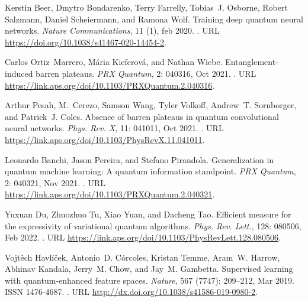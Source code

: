 \documentclass[letterpaper,preprintnumbers,preprint,aps,accepted=2022-05-26]{quantumarticle}
\begin{document}
\begin{thebibliography}{39}
Kerstin Beer, Dmytro Bondarenko, Terry Farrelly, Tobias~J. Osborne, Robert
  Salzmann, Daniel Scheiermann, and Ramona Wolf.
\newblock Training deep quantum neural networks.
\newblock \emph{Nature Communications}, 11 (1), feb 2020.
\newblock {}.
\newblock URL \url{https://doi.org/10.1038/s41467-020-14454-2}.

Carlos Ortiz~Marrero, M\'aria Kieferov\'a, and Nathan Wiebe.
\newblock Entanglement-induced barren plateaus.
\newblock \emph{PRX Quantum}, 2: 040316, Oct 2021.
\newblock {}.
\newblock URL \url{https://link.aps.org/doi/10.1103/PRXQuantum.2.040316}.

Arthur Pesah, M.~Cerezo, Samson Wang, Tyler Volkoff, Andrew~T. Sornborger, and
  Patrick~J. Coles.
\newblock Absence of barren plateaus in quantum convolutional neural networks.
\newblock \emph{Phys. Rev. X}, 11: 041011, Oct 2021.
\newblock {}.
\newblock URL \url{https://link.aps.org/doi/10.1103/PhysRevX.11.041011}.

Leonardo Banchi, Jason Pereira, and Stefano Pirandola.
\newblock Generalization in quantum machine learning: A quantum information
  standpoint.
\newblock \emph{PRX Quantum}, 2: 040321, Nov 2021.
\newblock {}.
\newblock URL \url{https://link.aps.org/doi/10.1103/PRXQuantum.2.040321}.

Yuxuan Du, Zhuozhuo Tu, Xiao Yuan, and Dacheng Tao.
\newblock Efficient measure for the expressivity of variational quantum
  algorithms.
\newblock \emph{Phys. Rev. Lett.}, 128: 080506, Feb 2022.
\newblock {}.
\newblock URL \url{https://link.aps.org/doi/10.1103/PhysRevLett.128.080506}.

Vojtěch Havlíček, Antonio~D. Córcoles, Kristan Temme, Aram~W. Harrow,
  Abhinav Kandala, Jerry~M. Chow, and Jay~M. Gambetta.
\newblock Supervised learning with quantum-enhanced feature spaces.
\newblock \emph{Nature}, 567 (7747): 209–212, Mar 2019.
\newblock ISSN 1476-4687.
\newblock {}.
\newblock URL \url{http://dx.doi.org/10.1038/s41586-019-0980-2}.


\end{thebibliography}
\end{document}
